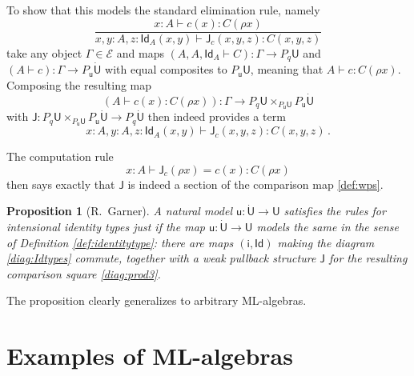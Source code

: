 \documentclass[12pt,reqno]{amsart}
\newcommand{\ednote}[1]{[\textit{\color{red}{#1}}]} %
\newcommand{\EE}{\ensuremath{\mathcal{E}}}
\renewcommand{\to}{\ensuremath{\rightarrow}}
\newcommand{\Id}{\mathsf{Id}}
\renewcommand{\t}{\ensuremath{\mathsf{u}}}
\newcommand{\T}{\ensuremath{\mathsf{U}}}
\newcommand{\TT}{\ensuremath{\dot{\mathsf{U}}}}
\newtheorem{proposition}[theorem]{Proposition}
\theoremstyle{remark}
\theoremstyle{definition}
\begin{document}
To show that this models the standard elimination rule, namely
\[
\frac{x:A\vdash c(x) : C(\rho x)}{x, y:A, z : \Id_A(x, y)\vdash \mathsf{J}_c(x,y,z) : C(x,y,z)}
\]
take any object $\Gamma \in \EE$  and maps $(A, A, \Id_{A} \vdash C) : \Gamma \to P_q\T$ and $(A \vdash c) : \Gamma \to P_\t\TT$ with equal composites to $P_\t\T$, meaning that $A \vdash c : C(\rho x)$.  Composing the resulting map 
\[
(A\vdash c(x):C(\rho x)) : \Gamma \to P_q\T \times_{P_\t\T} P_\t\TT
\]
with $\mathsf{J} : P_q\T \times_{P_\t\T} P_\t\TT \to P_q \TT$ then indeed provides a term $$x:A, y:A, z:\Id_{A}(x,y)  \vdash \mathsf{J}_c(x,y,z) : C(x,y,z)\,.$$

The computation rule
\[
x: A \vdash \mathsf{J}_c(\rho x) = c(x) : C(\rho x)
\]
then says exactly that $\mathsf{J}$ is indeed a section of the comparison map \eqref{def:wps}.

\begin{proposition}[R.\ Garner]\label{prop:Id-typesfromML}  A natural model $\t : \TT \to \T$ satisfies the rules for intensional identity types just if the map $\t : \TT \to \T$ \emph{models} the same in the sense of Definition \ref{def:identitytype}: there are maps $(\mathsf{i}, \Id)$ making the diagram \eqref{diag:Idtypes} commute, together with a weak pullback structure $\mathsf{J}$ for the resulting comparison square \eqref{diag:prod3}.
\end{proposition}

The proposition clearly generalizes to arbitrary ML-algebras.

\section{Examples of ML-algebras}\label{sec:ExamplesML-Algebras}
\end{document}
